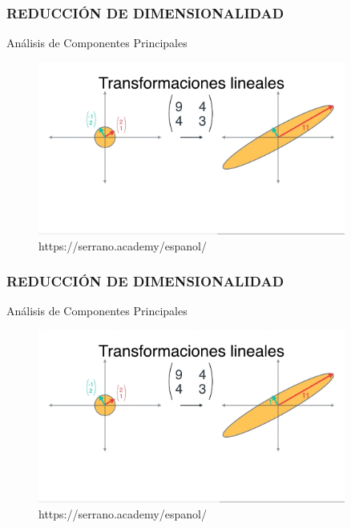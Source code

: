 \documentclass{beamer}
\begin{document}
\begin{frame}
	\frametitle{REDUCCIÓN DE DIMENSIONALIDAD}
	\begin{block}{Análisis de Componentes Principales}	
		\begin{figure}
			\includegraphics[width=0.9\textwidth]{PCA/IMG_3573.jpg}
			\caption{https://serrano.academy/espanol/}
		\end{figure}
	\end{block}
\end{frame}

\begin{frame}
	\frametitle{REDUCCIÓN DE DIMENSIONALIDAD}
	\begin{block}{Análisis de Componentes Principales}	
		\begin{figure}
			\includegraphics[width=0.9\textwidth]{PCA/IMG_3574.jpg}
			\caption{https://serrano.academy/espanol/}
		\end{figure}
	\end{block}
\end{frame}
\end{document}
